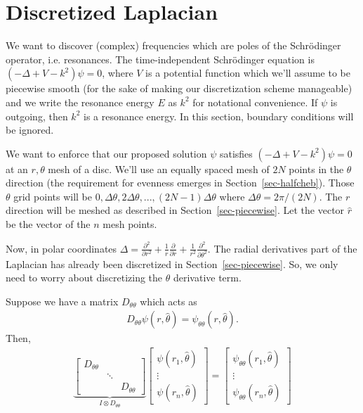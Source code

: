 \section{Discretized Laplacian}
\label{sec-laplacian}

We want to discover (complex) frequencies which are
poles of the Schr\"odinger operator, i.e. resonances.
The time-independent Schr\"odinger equation is
$(-\Delta + V - k^2)\psi = 0$, where $V$ is a potential
function which we'll assume to be piecewise smooth (for
the sake of making our discretization scheme manageable)
and we write the resonance energy $E$ as $k^2$ 
for notational convenience. If $\psi$
is outgoing, then $k^2$ is a resonance energy. In this section,
boundary conditions will be ignored.

We want to enforce that our proposed solution $\psi$ satisfies
$(-\Delta +V - k^2)\psi = 0$ at an $r,\theta$ mesh of a disc.
We'll use an equally spaced mesh of $2N$ points
in the $\theta$ direction (the requirement for evenness
emerges in Section~\ref{sec-halfcheb}).
Those $\theta$ grid points will be $0, \Delta\theta, 2\Delta\theta, ...
, (2N-1)\Delta\theta$ where $\Delta\theta = 2\pi/(2N)$. 
The $r$ direction will be meshed as described in
Section~\ref{sec-piecewise}. Let the vector $\hat{r}$ be the
vector of the $n$ mesh points.

Now, in polar coordinates $\Delta = \frac{\partial^2}{\partial r^2}                         
+ \frac{1}{r} \frac{\partial}{\partial r} + \frac{1}{r^2}                    
\frac{\partial^2}{\partial \theta^2}$. 
The radial derivatives part of the Laplacian has already been
discretized in Section~\ref{sec-piecewise}.
So, we only need to worry about discretizing the $\theta$ derivative
term. 


Suppose we have a matrix $D_{\theta\theta}$ which acts as
\begin{align*}
 D_{\theta\theta}\psi(r,\hat{\theta})
  = \psi_{\theta\theta}(r,\hat{\theta}).
\end{align*}
Then,
\begin{align*}
 \underbrace{
 \begin{bmatrix}
  D_{\theta\theta} &        & \\
                   & \ddots & \\
                   &        & D_{\theta\theta}
 \end{bmatrix}
 }_{I \otimes D_{\theta\theta}}
 \begin{bmatrix}
  \psi(r_1,\hat{\theta}) \\ \vdots \\ \psi(r_n,\hat{\theta})
 \end{bmatrix}
 =
 \begin{bmatrix}
  \psi_{\theta\theta}(r_1,\hat{\theta}) \\
  \vdots \\
  \psi_{\theta\theta}(r_n,\hat{\theta})
 \end{bmatrix}
\end{align*}

